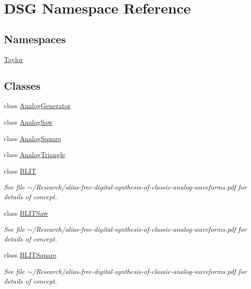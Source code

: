 \hypertarget{namespaceDSG}{\section{D\+S\+G Namespace Reference}
\label{namespaceDSG}
}
\subsection*{Namespaces}
\begin{DoxyCompactItemize}
\item 
 \hyperlink{namespaceDSG_1_1Taylor}{Taylor}
\end{DoxyCompactItemize}
\subsection*{Classes}
\begin{DoxyCompactItemize}
\item 
class \hyperlink{classDSG_1_1AnalogGenerator}{Analog\+Generator}
\item 
class \hyperlink{classDSG_1_1AnalogSaw}{Analog\+Saw}
\item 
class \hyperlink{classDSG_1_1AnalogSquare}{Analog\+Square}
\item 
class \hyperlink{classDSG_1_1AnalogTriangle}{Analog\+Triangle}
\item 
class \hyperlink{classDSG_1_1BLIT}{B\+L\+I\+T}
\begin{DoxyCompactList}\small\item\em See file $\sim$/\+Research/alias-\/free-\/digital-\/synthesis-\/of-\/classic-\/analog-\/waveforms.pdf for details of concept. \end{DoxyCompactList}\item 
class \hyperlink{classDSG_1_1BLITSaw}{B\+L\+I\+T\+Saw}
\begin{DoxyCompactList}\small\item\em See file $\sim$/\+Research/alias-\/free-\/digital-\/synthesis-\/of-\/classic-\/analog-\/waveforms.pdf for details of concept. \end{DoxyCompactList}\item 
class \hyperlink{classDSG_1_1BLITSquare}{B\+L\+I\+T\+Square}
\begin{DoxyCompactList}\small\item\em See file $\sim$/\+Research/alias-\/free-\/digital-\/synthesis-\/of-\/classic-\/analog-\/waveforms.pdf for details of concept. \end{DoxyCompactList}\item 

\end{DoxyCompactItemize}
